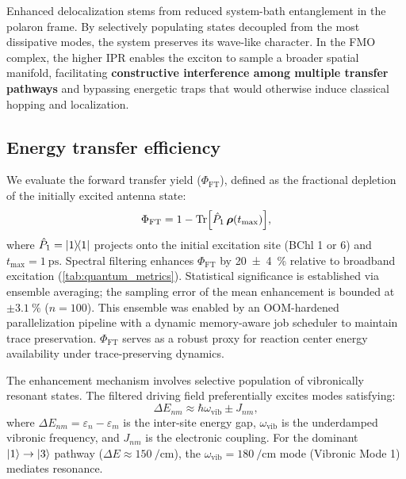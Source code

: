 \documentclass[journal=jpcl,manuscript=letter]{achemso}
\begin{document}
Enhanced delocalization stems from reduced system-bath entanglement in the polaron frame. By selectively populating states decoupled from the most dissipative modes, the system preserves its wave-like character. In the FMO complex, the higher IPR enables the exciton to sample a broader spatial manifold, facilitating \textbf{constructive interference among multiple transfer pathways} and bypassing energetic traps that would otherwise induce classical hopping and localization.

\subsection*{Energy transfer efficiency}

We evaluate the forward transfer yield ($\Phi_{\mathrm{FT}}$), defined as the fractional depletion of the initially excited antenna state:
\begin{equation}
\Phi_{\mathrm{FT}} = 1 - \Tr[\hat{P}_{1}\,\vb*{\rho}(t_{\max})],
\label{eq:ETE}
\end{equation}
where $\hat{P}_{1} = \dyad{1}$ projects onto the initial excitation site (BChl 1 or 6) and $t_{\max} = \SI{1}{\pico\second}$. Spectral filtering enhances $\Phi_{\mathrm{FT}}$ by \SI{20(4)}{\percent} relative to broadband excitation (\cref{tab:quantum_metrics}). Statistical significance is established via ensemble averaging; the sampling error of the mean enhancement is bounded at $\pm \SI{3.1}{\percent}$ ($n=\num{100}$). This ensemble was enabled by an OOM-hardened parallelization pipeline with a dynamic memory-aware job scheduler to maintain trace preservation. $\Phi_{\mathrm{FT}}$ serves as a robust proxy for reaction center energy availability under trace-preserving dynamics.

The enhancement mechanism involves selective population of vibronically resonant states. The filtered driving field preferentially excites modes satisfying:
\begin{equation}
\Delta E_{nm} \approx \hbar\omega_{\mathrm{vib}} \pm J_{nm},
\label{eq:resonance_condition}
\end{equation}
where $\Delta E_{nm} = \varepsilon_n - \varepsilon_m$ is the inter-site energy gap, $\omega_{\mathrm{vib}}$ is the underdamped vibronic frequency, and $J_{nm}$ is the electronic coupling. For the dominant $\ket{1} \to \ket{3}$ pathway ($\Delta E \approx \SI{150}{\per\centi\meter}$), the $\omega_{\mathrm{vib}} = \SI{180}{\per\centi\meter}$ mode (Vibronic Mode 1) mediates resonance.\cite{Chin2013,Fleming2015,Scholes2015}
\end{document}
